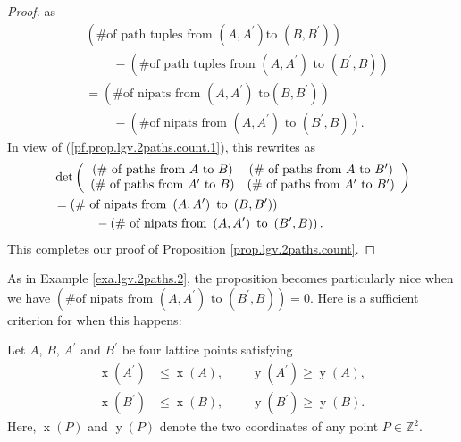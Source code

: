 \begin{definition}
\begin{proof}
as%
\begin{align*}
&  \left(  \text{\# of path tuples from }\left(  A,A^{\prime}\right)  \text{
to }\left(  B,B^{\prime}\right)  \right) \\
&  \ \ \ \ \ \ \ \ \ \ -\left(  \text{\# of path tuples from }\left(
A,A^{\prime}\right)  \text{ to }\left(  B^{\prime},B\right)  \right) \\
&  =\left(  \text{\# of nipats from }\left(  A,A^{\prime}\right)  \text{ to
}\left(  B,B^{\prime}\right)  \right) \\
&  \ \ \ \ \ \ \ \ \ \ -\left(  \text{\# of nipats from }\left(  A,A^{\prime
}\right)  \text{ to }\left(  B^{\prime},B\right)  \right)  .
\end{align*}
In view of (\ref{pf.prop.lgv.2paths.count.1}), this rewrites as%
\begin{align*}
&  \det\left(
\begin{array}
[c]{cc}%
\left(  \text{\# of paths from }A\text{ to }B\right)  & \left(  \text{\# of
paths from }A\text{ to }B^{\prime}\right) \\
\left(  \text{\# of paths from }A^{\prime}\text{ to }B\right)  & \left(
\text{\# of paths from }A^{\prime}\text{ to }B^{\prime}\right)
\end{array}
\right) \\
&  =\left(  \text{\# of nipats from }\left(  A,A^{\prime}\right)  \text{ to
}\left(  B,B^{\prime}\right)  \right) \\
&  \ \ \ \ \ \ \ \ \ \ -\left(  \text{\# of nipats from }\left(  A,A^{\prime
}\right)  \text{ to }\left(  B^{\prime},B\right)  \right)  .
\end{align*}
This completes our proof of Proposition \ref{prop.lgv.2paths.count}.
\end{proof}

As in Example \ref{exa.lgv.2paths.2}, the proposition becomes particularly
nice when we have $\left(  \text{\# of nipats from }\left(  A,A^{\prime
}\right)  \text{ to }\left(  B^{\prime},B\right)  \right)  =0$. Here is a
sufficient criterion for when this happens:

\begin{proposition}
\label{prop.lgv.jordan-2}Let $A$, $B$, $A^{\prime}$
and $B^{\prime}$ be four lattice points satisfying%
\begin{align}
\operatorname*{x}\left(  A^{\prime}\right)   &  \leq\operatorname*{x}\left(
A\right)  ,\ \ \ \ \ \ \ \ \ \ \operatorname*{y}\left(  A^{\prime}\right)
\geq\operatorname*{y}\left(  A\right)  ,\label{eq.prop.lgv.jordan-2.1}\\
\operatorname*{x}\left(  B^{\prime}\right)   &  \leq\operatorname*{x}\left(
B\right)  ,\ \ \ \ \ \ \ \ \ \ \operatorname*{y}\left(  B^{\prime}\right)
\geq\operatorname*{y}\left(  B\right)  . \label{eq.prop.lgv.jordan-2.2}%
\end{align}
Here, $\operatorname*{x}\left(  P\right)  $ and $\operatorname*{y}\left(
P\right)  $ denote the two coordinates of any point $P\in\mathbb{Z}^{2}$.


\end{proposition}
\end{definition}
